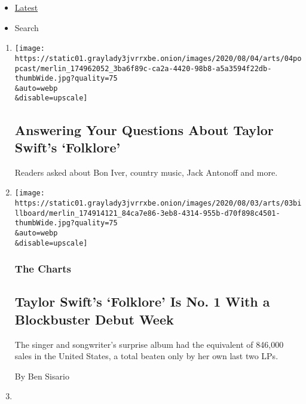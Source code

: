 \begin{itemize}
\tightlist
\item
  \protect\hyperlink{stream-panel}{Latest}
\item
  Search
\end{itemize}

\begin{enumerate}
\def\labelenumi{\arabic{enumi}.}
\item
  \href{/2020/08/04/arts/music/taylor-swift-folklore-questions.html}{}

  \texttt{[image: https://static01.graylady3jvrrxbe.onion/images/2020/08/04/arts/04popcast/merlin\_174962052\_3ba6f89c-ca2a-4420-98b8-a5a3594f22db-thumbWide.jpg?quality=75\\\&auto=webp\\\&disable=upscale]}

  \hypertarget{answering-your-questions-about-taylor-swifts-folklore}{%
  \subsection{Answering Your Questions About Taylor Swift's
  `Folklore'}\label{answering-your-questions-about-taylor-swifts-folklore}}

  Readers asked about Bon Iver, country music, Jack Antonoff and more.
\item
  \href{/2020/08/03/arts/music/taylor-swift-folklore-billboard-chart.html}{}

  \texttt{[image: https://static01.graylady3jvrrxbe.onion/images/2020/08/03/arts/03billboard/merlin\_174914121\_84ca7e86-3eb8-4314-955b-d70f898c4501-thumbWide.jpg?quality=75\\\&auto=webp\\\&disable=upscale]}

  \hypertarget{the-charts}{%
  \subsubsection{The Charts}\label{the-charts}}

  \hypertarget{taylor-swifts-folklore-is-no-1-with-a-blockbuster-debut-week}{%
  \subsection{Taylor Swift's `Folklore' Is No. 1 With a Blockbuster
  Debut
  Week}\label{taylor-swifts-folklore-is-no-1-with-a-blockbuster-debut-week}}

  The singer and songwriter's surprise album had the equivalent of
  846,000 sales in the United States, a total beaten only by her own
  last two LPs.

  By Ben Sisario
\item
  \href{/2020/07/31/arts/music/malik-b-dead.html}{}


\end{enumerate}
